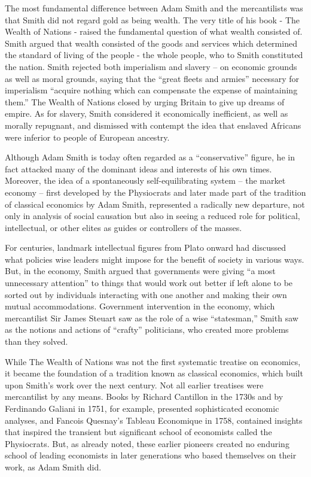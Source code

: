The most fundamental difference between Adam Smith and the mercantilists was that Smith did not regard gold as being wealth. The very title of his book - The Wealth of Nations - raised the fundamental question of what wealth consisted of. Smith argued that wealth consisted of the goods and services which determined the standard of living of the people - the whole people, who to Smith constituted the nation. Smith rejected both imperialism and slavery – on economic grounds as well as moral grounds, saying that the ``great fleets and armies'' necessary for imperialism ``acquire nothing which can compensate the expense of maintaining them.'' The Wealth of Nations closed by urging Britain to give up dreams of empire. As for slavery, Smith considered it economically inefficient, as well as morally repugnant, and dismissed with contempt the idea that enslaved Africans were inferior to people of European ancestry.

Although Adam Smith is today often regarded as a “conservative” figure, he in fact attacked many of the dominant ideas and interests of his own times. Moreover, the idea of a spontaneously self-equilibrating system – the market economy – first developed by the Physiocrats and later made part of the tradition of classical economics by Adam Smith, represented a radically new departure, not only in analysis of social causation but also in seeing a reduced role for political, intellectual, or other elites as guides or controllers of the masses.

For centuries, landmark intellectual figures from Plato onward had discussed what policies wise leaders might impose for the benefit of society in various ways. But, in the economy, Smith argued that governments were giving ``a most unnecessary attention'' to things that would work out better if left alone to be sorted out by individuals interacting with one another and making their own mutual accommodations. Government intervention in the economy, which mercantilist Sir James Steuart saw as the role of a wise ``statesman,'' Smith saw as the notions and actions of ``crafty'' politicians, who created more problems than they solved.

While The Wealth of Nations was not the first systematic treatise on economics, it became the foundation of a tradition known as classical economics, which built upon Smith’s work over the next century. Not all earlier treatises were mercantilist by any means. Books by Richard Cantillon in the 1730s and by Ferdinando Galiani in 1751, for example, presented sophisticated economic analyses, and Fancois Quesnay’s Tableau Economique in 1758, contained insights that inspired the transient but significant school of economists called the Physiocrats. But, as already noted, these earlier pioneers created no enduring school of leading economists in later generations who based themselves on their work, as Adam Smith did.

